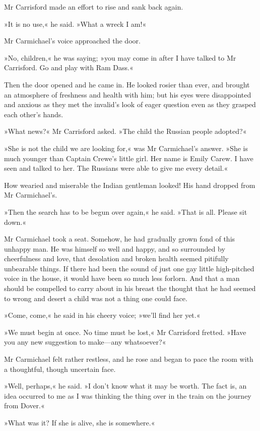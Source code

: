 Mr Carrisford made an effort to rise and sank back again.

»It is no use,« he said. »What a wreck I am!«

Mr Carmichael's voice approached the door.

»No, children,« he was saying; »you may come in after I have talked to Mr Carrisford. Go and play with Ram Dass.«

Then the door opened and he came in. He looked rosier than ever, and brought an atmosphere of freshness and health with him; but his eyes were disappointed and anxious as they met the invalid's look of eager question even as they grasped each other's hands.

»What news?« Mr Carrisford asked. »The child the Russian people adopted?«

»She is not the child we are looking for,« was Mr Carmichael's answer. »She is much younger than Captain Crewe's little girl. Her name is Emily Carew. I have seen and talked to her. The Russians were able to give me every detail.«

How wearied and miserable the Indian gentleman looked! His hand dropped from Mr Carmichael's.

»Then the search has to be begun over again,« he said. »That is all. Please sit down.«

Mr Carmichael took a seat. Somehow, he had gradually grown fond of this unhappy man. He was himself so well and happy, and so surrounded by cheerfulness and love, that desolation and broken health seemed pitifully unbearable things. If there had been the sound of just one gay little high-pitched voice in the house, it would have been so much less forlorn. And that a man should be compelled to carry about in his breast the thought that he had seemed to wrong and desert a child was not a thing one could face.

»Come, come,« he said in his cheery voice; »we'll find her yet.«

»We must begin at once. No time must be lost,« Mr Carrisford fretted. »Have you any new suggestion to make—any whatsoever?«

Mr Carmichael felt rather restless, and he rose and began to pace the room with a thoughtful, though uncertain face.

»Well, perhaps,« he said. »I don't know what it may be worth. The fact is, an idea occurred to me as I was thinking the thing over in the train on the journey from Dover.«

»What was it? If she is alive, she is somewhere.«

